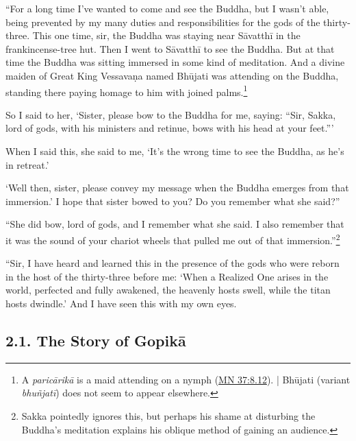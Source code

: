 \documentclass[12pt,openany]{book}%
\begin{document}
“For a long time I’ve wanted to come and see the Buddha, but I wasn’t able, being prevented by my many duties and responsibilities for the gods of the thirty-three. This one time, sir, the Buddha was staying near \textsanskrit{Sāvatthī} in the frankincense-tree hut. Then I went to \textsanskrit{Sāvatthī} to see the Buddha. But at that time the Buddha was sitting immersed in some kind of meditation. And a divine maiden of Great King \textsanskrit{Vessavaṇa} named \textsanskrit{Bhūjati} was attending on the Buddha, standing there paying homage to him with joined palms.\footnote{A \textit{\textsanskrit{paricārikā}} is a maid attending on a nymph (\href{https://suttacentral.net/mn37/en/sujato\#8.12}{MN 37:8.12}). | \textsanskrit{Bhūjati} (variant \textit{\textsanskrit{bhuñjatī}}) does not seem to appear elsewhere. } 

So I said to her, ‘Sister, please bow to the Buddha for me, saying: “Sir, Sakka, lord of gods, with his ministers and retinue, bows with his head at your feet.”’ 

When I said this, she said to me, ‘It’s the wrong time to see the Buddha, as he’s in retreat.’ 

‘Well then, sister, please convey my message when the Buddha emerges from that immersion.’ I hope that sister bowed to you? Do you remember what she said?” 

“She did bow, lord of gods, and I remember what she said. I also remember that it was the sound of your chariot wheels that pulled me out of that immersion.”\footnote{Sakka pointedly ignores this, but perhaps his shame at disturbing the Buddha’s meditation explains his oblique method of gaining an audience. } 

“Sir, I have heard and learned this in the presence of the gods who were reborn in the host of the thirty-three before me: ‘When a Realized One arises in the world, perfected and fully awakened, the heavenly hosts swell, while the titan hosts dwindle.’ And I have seen this with my own eyes. 

\subsection*{2.1. The Story of \textsanskrit{Gopikā} }
\end{document}
